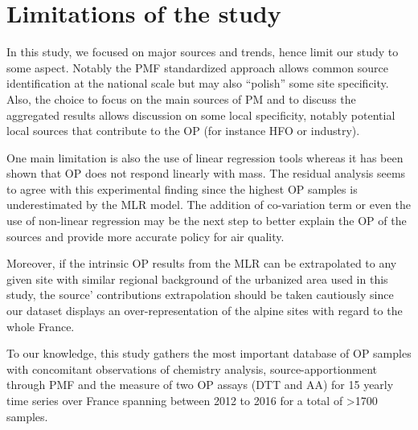 \documentclass[acp]{copernicus}
\begin{document}
\section{Limitations of the study}%
\label{limitations-of-the-study}

In this study, we focused on major sources and trends, hence limit our
study to some aspect. Notably the PMF standardized approach allows
common source identification at the national scale but may also
``polish'' some site specificity. Also, the choice to focus on the main
sources of PM and to discuss the aggregated results allows discussion on
some local specificity, notably potential local sources that contribute
to the OP (for instance HFO or industry).

One main limitation is also the use of linear regression tools whereas
it has been shown that OP does not respond linearly with mass. The
residual analysis seems to agree with this experimental finding since
the highest OP samples is underestimated by the MLR model. The addition
of co-variation term or even the use of non-linear regression may be the
next step to better explain the OP of the sources and provide more
accurate policy for air quality.

Moreover, if the intrinsic OP results from the MLR can be extrapolated
to any given site with similar regional background of the urbanized area
used in this study, the source' contributions extrapolation should be
taken cautiously since our dataset displays an over-representation of
the alpine sites with regard to the whole France.

\conclusions  %

To our knowledge, this study gathers the most important database of OP
samples with concomitant observations of chemistry analysis,
source-apportionment through PMF and the measure of two OP assays (DTT
and AA) for 15 yearly time series over France spanning between 2012 to
2016 for a total of \textgreater1700 samples.
\end{document}
